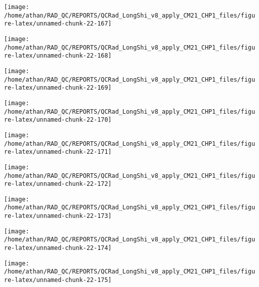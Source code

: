 \documentclass[
  10pt,
  a4paper,oneside]{article}
\begin{document}
\begin{center}\texttt{[image: /home/athan/RAD\_QC/REPORTS/QCRad\_LongShi\_v8\_apply\_CM21\_CHP1\_files/figure-latex/unnamed-chunk-22-167]} \end{center}

\begin{center}\texttt{[image: /home/athan/RAD\_QC/REPORTS/QCRad\_LongShi\_v8\_apply\_CM21\_CHP1\_files/figure-latex/unnamed-chunk-22-168]} \end{center}

\begin{center}\texttt{[image: /home/athan/RAD\_QC/REPORTS/QCRad\_LongShi\_v8\_apply\_CM21\_CHP1\_files/figure-latex/unnamed-chunk-22-169]} \end{center}

\begin{center}\texttt{[image: /home/athan/RAD\_QC/REPORTS/QCRad\_LongShi\_v8\_apply\_CM21\_CHP1\_files/figure-latex/unnamed-chunk-22-170]} \end{center}

\begin{center}\texttt{[image: /home/athan/RAD\_QC/REPORTS/QCRad\_LongShi\_v8\_apply\_CM21\_CHP1\_files/figure-latex/unnamed-chunk-22-171]} \end{center}

\begin{center}\texttt{[image: /home/athan/RAD\_QC/REPORTS/QCRad\_LongShi\_v8\_apply\_CM21\_CHP1\_files/figure-latex/unnamed-chunk-22-172]} \end{center}

\begin{center}\texttt{[image: /home/athan/RAD\_QC/REPORTS/QCRad\_LongShi\_v8\_apply\_CM21\_CHP1\_files/figure-latex/unnamed-chunk-22-173]} \end{center}

\begin{center}\texttt{[image: /home/athan/RAD\_QC/REPORTS/QCRad\_LongShi\_v8\_apply\_CM21\_CHP1\_files/figure-latex/unnamed-chunk-22-174]} \end{center}

\begin{center}\texttt{[image: /home/athan/RAD\_QC/REPORTS/QCRad\_LongShi\_v8\_apply\_CM21\_CHP1\_files/figure-latex/unnamed-chunk-22-175]} \end{center}
\end{document}
